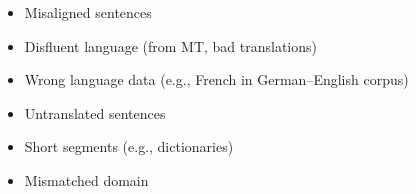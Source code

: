 \documentclass[landscape]{jhuslides3C}
\begin{document}

\vfill
\begin{itemize}
\item Misaligned sentences
\item Disfluent language (from MT, bad translations)
\item Wrong language data (e.g., French in German--English corpus)
\item Untranslated sentences
\item Short segments (e.g., dictionaries)
\item Mismatched domain
\end{itemize}
\vfill




\newcommand{\debugcolor}{white}

\newcommand{\barchartnoise}[5]{\begin{tikzpicture}[scale=0.3]
\fill[\debugcolor] (5.7,0) rectangle (5.8,-#1);
\fill[\debugcolor] (5.7,0) rectangle (5.8,4);
\fill[green] (0,0) rectangle (5.5,0#3);
\fill[blue] (6,0) rectangle (11.5,0#5);
\draw (2.75,0) node[anchor=south] {#2};
\draw (8.75,0) node[anchor=south] {#4};
\draw (2.75,0#3) node[anchor=north] {\textcolor{red}{#3}};
\draw (8.75,0#5) node[anchor=north] {\textcolor{red}{#5}};
\end{tikzpicture}}

\newcommand{\positivebarchart}[5]{\begin{tikzpicture}[scale=0.3]
\fill[\debugcolor] (5.7,0) rectangle (5.8,-#1);
\fill[\debugcolor] (5.7,0) rectangle (5.8,4);
\fill[green] (0,0) rectangle (5.5,0#3);
\fill[blue] (6,0) rectangle (11.5,0#5);
\draw (2.75,0) node[anchor=south] {#2};
\draw (8.75,0) node[anchor=south] {#4};
\draw (2.75,0#3) node[anchor=north] {\textcolor{darkgreen}{#3}};
\draw (8.75,0#5) node[anchor=north] {\textcolor{darkgreen}{#5}};
\end{tikzpicture}}

\newcommand{\negposbarchart}[5]{\begin{tikzpicture}[scale=0.3]
\fill[\debugcolor] (5.7,0) rectangle (5.8,-#1);
\fill[\debugcolor] (5.7,0) rectangle (5.8,4);
\fill[green] (0,0) rectangle (5.5,0#3);
\fill[blue] (6,0) rectangle (11.5,0#5);
\draw (2.75,0) node[anchor=south] {#2};
\draw (8.75,0) node[anchor=south] {#4};
\draw (2.75,0#3) node[anchor=north] {\textcolor{red}{#3}};
\draw (8.75,0) node[anchor=north] {\textcolor{darkgreen}{#5}};
\end{tikzpicture}}
\end{document}

